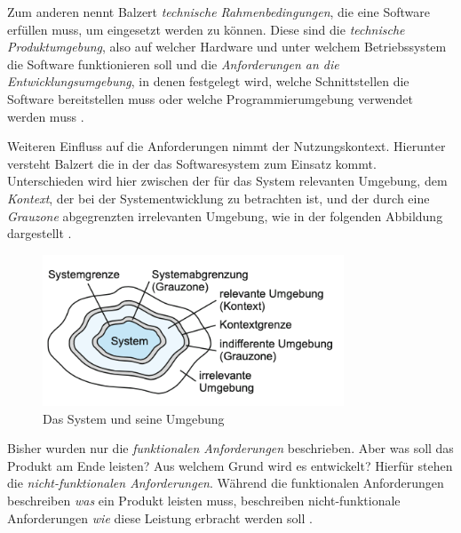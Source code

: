 Zum anderen nennt Balzert \textit{technische Rahmenbedingungen}, die eine Software erfüllen muss, um eingesetzt werden zu können. Diese sind die \textit{technische Produktumgebung}, also auf welcher Hardware und unter welchem Betriebssystem die Software funktionieren soll und die \textit{Anforderungen an die Entwicklungsumgebung}, in denen \ua festgelegt wird, welche Schnittstellen die Software bereitstellen muss oder welche Programmierumgebung verwendet werden muss \citep[vgl.][S. 460 f.]{Balzert2010}.

Weiteren Einfluss auf die Anforderungen nimmt der Nutzungskontext. Hierunter versteht Balzert die  \citep[][461]{Balzert2010} in der das Softwaresystem zum Einsatz kommt. 
Unterschieden wird hier zwischen der für das System relevanten Umgebung, dem \textit{Kontext}, der bei der Systementwicklung zu betrachten ist, und der durch eine \textit{Grauzone} abgegrenzten irrelevanten Umgebung, wie in der folgenden Abbildung dargestellt \citep[vgl.][462]{Balzert2010}.

\begin{figure}[h]
  \centering
  \includegraphics[width=0.8\textwidth]{res/Anforderung1.png}
  \caption{Das System und seine Umgebung \citep[][462]{Balzert2010}}
  \label{fig:Systemumgebung}
\end{figure}

Bisher wurden nur die \textit{funktionalen Anforderungen} beschrieben. Aber was soll das Produkt am Ende leisten? Aus welchem Grund wird es entwickelt? Hierfür stehen die \textit{nicht-funktionalen Anforderungen}. 
Während die funktionalen Anforderungen beschreiben \textit{was} ein Produkt leisten muss, beschreiben nicht-funktionale Anforderungen \textit{wie} diese Leistung erbracht werden soll \citep[vgl.][30]{Partsch2010}.

